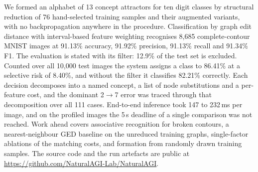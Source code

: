 We formed an alphabet of 13 concept attractors for ten digit classes by
structural reduction of 76 hand-selected training samples and their augmented
variants, with no backpropagation anywhere in the procedure. Classification by graph edit
distance with interval-based feature weighting recognises 8,685
complete-contour MNIST images at 91.13\% accuracy, 91.92\% precision,
91.13\% recall and 91.34\% F1. The evaluation is stated with its filter:
12.9\% of the test set is excluded. Counted over all 10,000 test images the
system assigns a class to 86.41\% at a selective risk of 8.40\%, and without the
filter it classifies 82.21\% correctly. Each decision decomposes into a named concept, a list of
node substitutions and a per-feature cost, and the dominant 2$\rightarrow$7
error was traced through that decomposition over all 111 cases. End-to-end
inference took 147 to 232\,ms per image, and on the profiled images the 5\,s
deadline of a single comparison was not reached. Work ahead covers associative
recognition for broken contours, a nearest-neighbour GED baseline on the
unreduced training graphs, single-factor ablations of the matching costs, and
formation from randomly drawn training samples. The source code and the run
artefacts are public at \url{https://github.com/NaturalAGI-Lab/NaturalAGI}.
